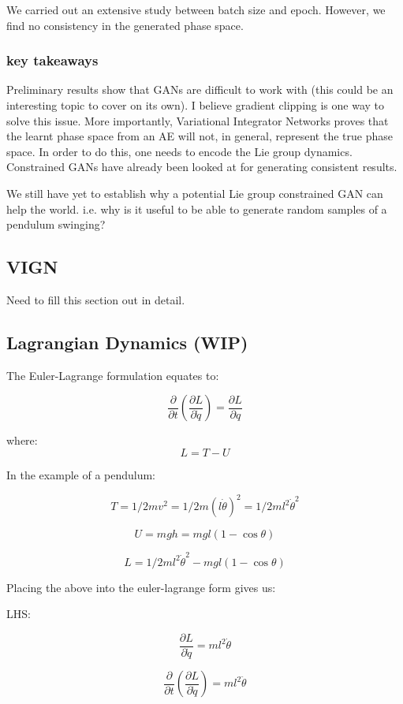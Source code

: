 \documentclass{article}
\begin{document}
We carried out an extensive study between batch size and epoch. However, we find no consistency in the generated phase space.

\subsubsection*{key takeaways}

Preliminary results show that GANs are difficult to work with (this could be an interesting topic to cover on its own). I believe gradient clipping is one way to solve this issue. 
More importantly, Variational Integrator Networks proves that the learnt phase space from an AE will not, in general, represent the true phase space. In order to do this, one needs to encode the Lie group dynamics.
Constrained GANs have already been looked at for generating consistent results.

We still have yet to establish why a potential Lie group constrained GAN can help the world. i.e. why is it useful to be able to generate random samples of a pendulum swinging?


\subsection{VIGN}

Need to fill this section out in detail.


\subsection{Lagrangian Dynamics (WIP)}
The Euler-Lagrange formulation equates to:

$$ \frac{\partial}{\partial t} (\frac{\partial L}{\partial \dot{q}}) = \frac{\partial L}{\partial q} $$

where:
$$ L = T - U $$

In the example of a pendulum:

$$ T = 1/2 mv^2 = 1/2 m (l\dot{\theta})^2 = 1/2 m l^2 \dot{\theta}^2 $$

$$ U = mgh = mgl(1- \cos \theta) $$

$$ L = 1/2 m l^2 \dot{\theta}^2 - mgl(1-\cos\theta) $$

Placing the above into the euler-lagrange form gives us:

LHS:

$$ \frac{\partial L}{\partial \dot{q}} = ml^2 \dot{\theta}$$

$$ \frac{\partial}{\partial t} (\frac{\partial L}{\partial \dot{q}}) = ml^2 \ddot{\theta} $$
\end{document}
